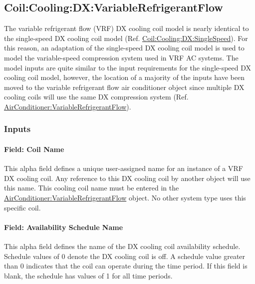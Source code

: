 \subsection{Coil:Cooling:DX:VariableRefrigerantFlow}\label{coilcoolingdxvariablerefrigerantflow}

The variable refrigerant flow (VRF) DX cooling coil model is nearly identical to the single-speed DX cooling coil model (Ref. \hyperref[coilcoolingdxsinglespeed]{Coil:Cooling:DX:SingleSpeed}). For this reason, an adaptation of the single-speed DX cooling coil model is used to model the variable-speed compression system used in VRF AC systems. The model inputs are quite similar to the input requirements for the single-speed DX cooling coil model, however, the location of a majority of the inputs have been moved to the variable refrigerant flow air conditioner object since multiple DX cooling coils will use the same DX compression system (Ref. \hyperref[airconditionervariablerefrigerantflow]{AirConditioner:VariableRefrigerantFlow}).

\subsubsection{Inputs}\label{inputs-6-010}

\paragraph{Field: Coil Name}\label{field-coil-name-000}

This alpha field defines a unique user-assigned name for an instance of a VRF DX cooling coil. Any reference to this DX cooling coil by another object will use this name. This cooling coil name must be entered in the \hyperref[airconditionervariablerefrigerantflow]{AirConditioner:VariableRefrigerantFlow} object. No other system type uses this specific coil.

\paragraph{Field: Availability Schedule Name}\label{field-availability-schedule-name-1-007}

This alpha field defines the name of the DX cooling coil availability schedule. Schedule values of 0 denote the DX cooling coil is off. A schedule value greater than 0 indicates that the coil can operate during the time period. If this field is blank, the schedule has values of 1 for all time periods.

